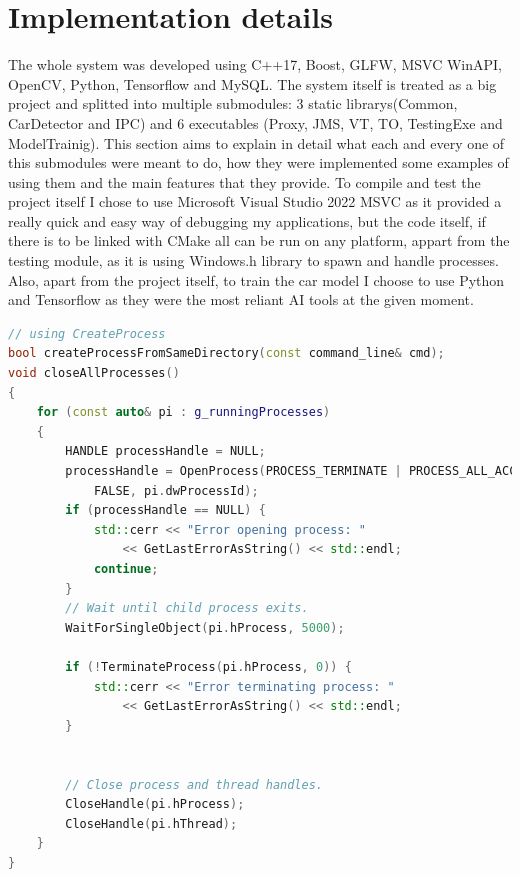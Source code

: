 \documentclass[17pt]{article}
\begin{document}
\section{Implementation details}
\indent \indent
The whole system was developed using C++17, Boost, GLFW, MSVC WinAPI, OpenCV,
Python, Tensorflow  and MySQL. The system itself is treated as a big project 
and splitted into multiple submodules: 3 static librarys(Common, CarDetector and IPC)
and 6 executables  (Proxy, JMS, VT, TO, TestingExe and ModelTrainig). This section
aims to explain in detail what each and every one of this submodules were meant to do,
how they were implemented some examples of using them and the main features that they
provide. To compile and test the project itself I chose to use Microsoft Visual Studio 
2022 MSVC as it provided a really quick and easy way of debugging my applications, but 
the code itself, if there is to be linked with CMake all can be run on any platform, 
appart from the testing module, as it is using Windows.h library to spawn and handle 
processes. Also, apart from the project itself, to train the car model I choose to use
Python and Tensorflow as they were the most reliant AI tools at the given moment.

\begin{lstlisting}[language = C++]
// using CreateProcess
bool createProcessFromSameDirectory(const command_line& cmd); 
void closeAllProcesses()
{
    for (const auto& pi : g_runningProcesses)
    {
        HANDLE processHandle = NULL;
        processHandle = OpenProcess(PROCESS_TERMINATE | PROCESS_ALL_ACCESS, 
            FALSE, pi.dwProcessId);
        if (processHandle == NULL) {
            std::cerr << "Error opening process: " 
                << GetLastErrorAsString() << std::endl;
            continue;
        }
        // Wait until child process exits.
        WaitForSingleObject(pi.hProcess, 5000);

        if (!TerminateProcess(pi.hProcess, 0)) {
            std::cerr << "Error terminating process: "
                << GetLastErrorAsString() << std::endl;
        }


        // Close process and thread handles. 
        CloseHandle(pi.hProcess);
        CloseHandle(pi.hThread);
    }
}
\end{lstlisting}

\pagebreak
\end{document}
